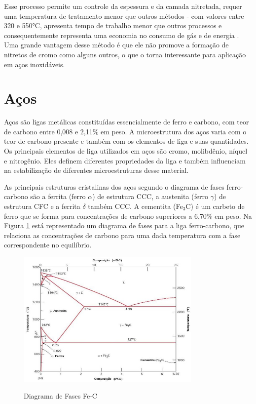 \documentclass[]{politex}
\begin{document}
	 Esse processo permite um controle da espessura e da camada nitretada, requer uma temperatura de tratamento menor que outros métodos - com valores entre 320 e 550°C, apresenta tempo de trabalho menor que outros processos e consequentemente representa uma economia no consumo de gás e de energia \cite{zimmermannnitretaccao}. 
	Uma grande vantagem desse método é que ele não promove a formação de nitretos de cromo como alguns outros, o que o torna interessante para aplicação em aços inoxidáveis.
	
\section{Aços}
	Aços são ligas metálicas constituídas essencialmente de ferro e carbono, com teor de carbono entre 0,008 e 2,11\% em peso. A microestrutura dos aços varia com o teor de carbono presente e também com os elementos de liga e suas quantidades. Os principais elementos de liga utilizados em aços são cromo, molibdênio, níquel e nitrogênio. Eles definem diferentes propriedades da liga e também influenciam na estabilização de diferentes microestruturas desse material. \par
	As principais estruturas cristalinas dos aços segundo o diagrama de fases ferro-carbono são a ferrita (ferro $\alpha$) de estrutura CCC, a austenita (ferro $\gamma$) de estrutura CFC e a ferrita $\delta$ também CCC. A cementita (Fe$_{3}$C) é um carbeto de ferro que se forma para concentrações de carbono superiores a 6,70\% em peso. Na Figura \ref{fig:diagrama-fases-fe-c} está representado um diagrama de fases para a liga ferro-carbono, que relaciona as concentrações de carbono para uma dada temperatura com a fase correspondente no equilíbrio.
	
\begin{figure}[ht]
	\caption{Diagrama de Fases Fe-C}
	\includegraphics[width=0.8\textwidth]{diagrama-fases-fe-c}
	\label{fig:diagrama-fases-fe-c}
	\centering
\end{figure}
\end{document}
